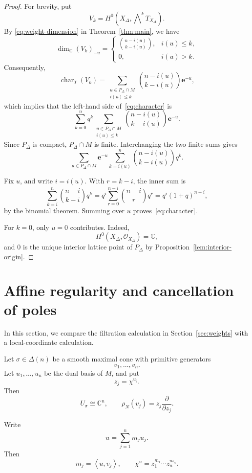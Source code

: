 \documentclass[colorlinks,11pt,reqno]{amsart}
\theoremstyle{definition}
\theoremstyle{remark}
\numberwithin{equation}{section}
\numberwithin{equation}{section}
\newcommand{\CC}{\mathbb{C}}
\newcommand{\Pair}[2]{\left\langle #1,#2\right\rangle}
\newcommand{\C}{\mathbb{C}}
\DeclareMathOperator{\charac}{char}
\begin{document}
\begin{proof}
For brevity, put
\[
V_k = H^0\!\left( X_\Delta,\bigwedge\nolimits^kT_{X_\Delta} \right).
\]
By \eqref{eq:weight-dimension} in Theorem~\ref{thm:main}, we have
\[
\dim_{\CC}(V_k)_{-u} = \begin{cases}
\displaystyle
\binom{n-i(u)}{k-i(u)},
&i(u)\leq k,\\[8pt]
0,
&i(u)>k.
\end{cases}
\]
Consequently,
\[
\charac_T(V_k) = \sum_{\substack{u\in P_\Delta\cap M\\i(u)\leq k}}
\binom{n-i(u)}{k-i(u)} \mathbf e^{-u},
\]
which implies that the left-hand side of~\eqref{eq:character} is
\[
\sum_{k=0}^{n} q^k \sum_{\substack{u\in P_\Delta\cap M\\i(u)\leq k}}
\binom{n-i(u)}{k-i(u)} \mathbf e^{-u}.
\]
Since \(P_\Delta\) is compact, \(P_\Delta\cap M\) is finite.
Interchanging the two finite sums gives
\[
\sum_{u\in P_\Delta\cap M} \mathbf e^{-u} \sum_{k=i(u)}^n \binom{n-i(u)}{k-i(u)}q^k.
\]

Fix \(u\), and write \(i=i(u)\). With \(r=k-i\), the inner sum is
\[
\sum_{k=i}^n \binom{n-i}{k-i}q^k = q^i \sum_{r=0}^{n-i} \binom{n-i}{r}q^r = q^i(1+q)^{n-i},
\]
by the binomial theorem. Summing over \(u\) proves~\eqref{eq:character}.

For \(k=0\), only \(u=0\) contributes. Indeed,
\[
H^0(X_\Delta,\mathcal{O}_{X_\Delta})=\C,
\]
and \(0\) is the unique interior lattice point of \(P_\Delta\) by Proposition~\ref{lem:interior-origin}.
\end{proof}

\section{Affine regularity and cancellation of poles}\label{sec:affine}

In this section, we compare the filtration calculation in Section~\ref{sec:weights} with a local-coordinate calculation.

Let \(\sigma\in\Delta(n)\) be a smooth maximal cone with primitive generators
\[
v_1,\dots,v_n.
\]
Let \(u_1,\dots,u_n\) be the dual basis of \(M\), and put
\[
z_j=\chi^{u_j}.
\]
Then
\[
U_\sigma\cong\CC^n, \qquad \rho_N(v_j) = z_j\frac{\partial}{\partial z_j}.
\]

Write
\[
u=\sum_{j=1}^{n}m_ju_j.
\]
Then
\[
m_j=\Pair{u}{v_j}, \qquad \chi^u=z_1^{m_1}\cdots z_n^{m_n}.
\]
\end{document}
